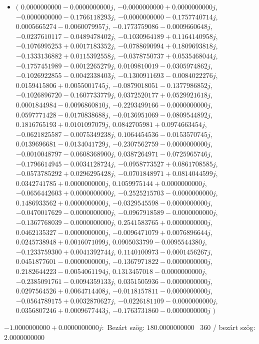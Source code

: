 \documentclass[14pt,a4paper]{article}
\begin{document}
\begin{itemize}
\item
$\big($
$0.0000000000-0.0000000000j$, $-0.0000000000+0.0000000000j$, $-0.0000000000-0.1766118293j$, $-0.0000000000-0.1757740714j$, $0.0005665274-0.0060079957j$, $-0.1773759086-0.0009660648j$, $-0.0237610117-0.0489478402j$, $-0.1030964189+0.1164140958j$, $-0.1076995253+0.0017183352j$, $-0.0788690994+0.1809693818j$, $-0.1333136882+0.0115392558j$, $-0.0378750737+0.0535468044j$, $-0.1757451989-0.0012265279j$, $0.0109810019-0.0305974862j$, $-0.1026922855-0.0042338403j$, $-0.1300911693-0.0084022276j$, $0.0159415806+0.0055001745j$, $-0.0879018051-0.1377986852j$, $-0.1026896720-0.1607733779j$, $0.0372520177+0.0529921618j$, $0.0001844984-0.0096860810j$, $-0.2293499166-0.0000000000j$, $0.0597771428-0.0170838688j$, $-0.0136951069-0.0809544892j$, $0.1816765193+0.0101097079j$, $0.0842705981+0.0974663454j$, $-0.0621825587-0.0075349238j$, $0.1064454536-0.0153570745j$, $0.0139696681-0.0134041729j$, $-0.2307562759-0.0000000000j$, $-0.0010048797-0.0608368900j$, $0.0387264971-0.0725965746j$, $-0.1796614945-0.0034128724j$, $-0.0958773527+0.0861708585j$, $-0.0573785292+0.0296295428j$, $-0.0701848971+0.0814044599j$, $0.0342741785+0.0000000000j$, $0.1059975144+0.0000000000j$, $-0.0656442603+0.0000000000j$, $-0.2525215703-0.0000000000j$, $0.1486933562+0.0000000000j$, $-0.0329545598-0.0000000000j$, $-0.0470017629-0.0000000000j$, $-0.0967918589-0.0000000000j$, $-0.1367768039-0.0000000000j$, $0.2541583765+0.0000000000j$, $0.0462135327-0.0000000000j$, $-0.0096471079+0.0076896644j$, $0.0245738948+0.0016071099j$, $0.0905033799-0.0095544380j$, $-0.1233759300+0.0041392744j$, $0.1140100973-0.0001456267j$, $0.0451877601-0.0000000000j$, $-0.1367971822-0.0000000000j$, $0.2182644223-0.0054061194j$, $0.1313457018-0.0000000000j$, $-0.2385091761-0.0094359133j$, $0.0351505936-0.0000000000j$, $0.0297564526+0.0064714408j$, $-0.0118157811-0.0000000000j$, $-0.0564789175+0.0032870627j$, $-0.0226181109-0.0000000000j$, $0.0356807246+0.0009677443j$, $-0.1763731860-0.0000000000j$
$\big)$
\end{itemize}
$-1.0000000000+0.0000000000j$:\
Bezárt szög: $180.0000000000$ \
360 / bezárt szög: $2.0000000000$\
\end{document}
